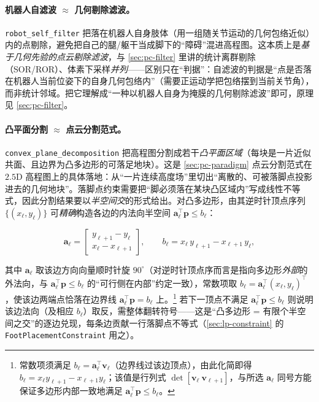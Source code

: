 \paragraph{机器人自滤波 $\approx$ 几何剔除滤波。}
\texttt{robot\_self\_filter} 把落在机器人自身肢体（用一组随关节运动的几何包络近似）内的点剔除，避免把自己的腿/躯干当成脚下的“障碍”混进高程图。这本质上是\emph{基于几何先验的点云剔除滤波}，与 \cref{sec:pc-filter} 里讲的统计离群剔除（SOR/ROR）、体素下采样\emph{并列}——区别只在“判据”：自滤波的判据是“点是否落在机器人当前位姿下的自身几何包络内”（需要正运动学把包络摆到当前关节角），而非统计邻域。把它理解成“一种以机器人自身为掩膜的几何剔除滤波”即可，原理见 \cref{sec:pc-filter}。

\paragraph{凸平面分割 $\approx$ 点云分割范式。}
\texttt{convex\_plane\_decomposition} 把高程图分割成若干\emph{凸平面区域}（每块是一片近似共面、且边界为凸多边形的可落足地块）。这是 \cref{sec:pc-paradigm} 点云分割范式在 $2.5$D 高程图上的具体落地：从“一片连续高度场”里切出“离散的、可被落脚点投影进去的几何地块”。落脚点约束需要把“脚必须落在某块凸区域内”写成线性不等式，因此分割结果要以\emph{半空间交}的形式给出。对凸多边形，由其逆时针顶点序列 $\{(x_\ell,y_\ell)\}$ 可\emph{精确}构造各边的内法向半空间 $\mathbf{a}_\ell^\top \mathbf{p}\le b_\ell$：

\begin{equation}
  \mathbf{a}_\ell=\begin{bmatrix} y_{\ell+1}-y_\ell \\ x_\ell-x_{\ell+1} \end{bmatrix},
  \qquad
  b_\ell = x_\ell\,y_{\ell+1} - x_{\ell+1}\,y_\ell,
  \label{eq:lp-halfspace}
\end{equation}

其中 $\mathbf{a}_\ell$ 取该边方向向量顺时针旋 $90^\circ$（对逆时针顶点序而言是指向多边形\emph{外部}的外法向，与 $\mathbf{a}_\ell^\top\mathbf{p}\le b_\ell$ 的“可行侧在内部”约定一致），常数项取 $b_\ell=\mathbf{a}_\ell^\top(x_\ell,y_\ell)^\top$，使该边两端点恰落在边界线 $\mathbf{a}_\ell^\top\mathbf{p}=b_\ell$ 上。\footnote{常数项须满足 $b_\ell=\mathbf{a}_\ell^\top\mathbf{v}_\ell$（边界线过该边顶点），由此化简即得 $b_\ell=x_\ell y_{\ell+1}-x_{\ell+1}y_\ell$；该值是行列式 $\det[\mathbf{v}_\ell\ \mathbf{v}_{\ell+1}]$，与所选 $\mathbf{a}_\ell$ 同号方能保证多边形内部一致地满足 $\mathbf{a}_\ell^\top\mathbf{p}\le b_\ell$。} 若下一顶点不满足 $\mathbf{a}_\ell^\top \mathbf{p}\le b_\ell$ 则说明该边法向（及相应 $b_\ell$）取反，需整体翻转符号——这是“凸多边形 = 有限个半空间之交”的逐边兑现，每条边贡献一行落脚点不等式（\cref{sec:lp-constraint} 的 \texttt{FootPlacementConstraint} 用之）。

